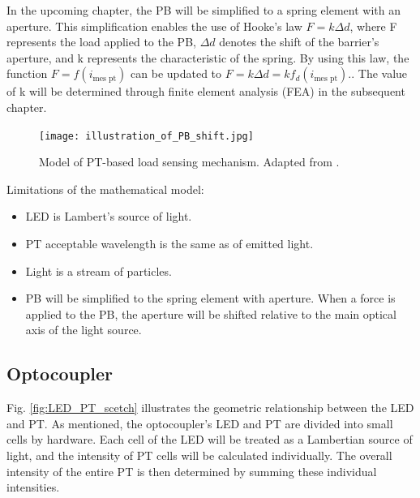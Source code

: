 In the upcoming chapter, the PB will be simplified to a spring element with an aperture. 
This simplification enables the use of Hooke's law $F = k\Delta d$, where F represents the load applied 
to the PB, $\Delta d$ denotes the shift of the barrier's aperture, and k represents the 
characteristic of the spring. 
By using this law, the function $F = f(i_{\text{mes pt}})$ can be updated to $F = k \Delta d = k f_d(i_{\text{mes pt}})$..
The value of k will be determined through finite element analysis (FEA) in the subsequent chapter. 

\begin{figure}[H]
  \centering
  \texttt{[image: illustration\_of\_PB\_shift.jpg]}
  \caption{Model of PT-based load sensing mechanism. Adapted from \cite[Fig. 1]{my_love_pressure_photosensor}.}
  \label{fig:load_pt_based_mechanism}
  \end{figure}

Limitations of the mathematical model:
\begin{itemize}
    \item LED is Lambert's source of light.
    \item PT acceptable wavelength is the same as of emitted light.
    \item Light is a stream of particles.
    \item PB will be simplified to the spring element with aperture. When a force is applied to the PB, the aperture will be shifted relative to the main optical axis of the light source.
\end{itemize}

\subsection{Optocoupler}
Fig. \ref{fig:LED_PT_scetch} illustrates the geometric relationship between the LED and PT. 
As mentioned, the optocoupler's LED and PT are divided into small cells by hardware.
 Each cell of the LED will be treated as a Lambertian source of light, and the intensity 
 of PT cells will be calculated individually. 
 The overall intensity of the entire PT is then determined by summing these individual intensities. 

